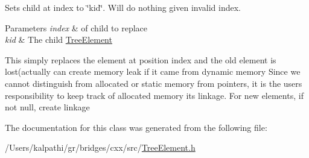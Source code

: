 Sets child at index to \char`\"{}kid\char`\"{}. Will do nothing given invalid index.


\begin{DoxyParams}{Parameters}
{\em index} & of child to replace \\
\hline
{\em kid} & The child \mbox{\hyperlink{classbridges_1_1_tree_element}{Tree\+Element}} \\
\hline
\end{DoxyParams}
This simply replaces the element at position index and the old element is lost(actually can create memory leak if it came from dynamic memory Since we cannot distinguish from allocated or static memory from pointers, it is the user\textquotesingle{}s responsibility to keep track of allocated memory its linkage. For new elements, if not null, create linkage

The documentation for this class was generated from the following file\+:\begin{DoxyCompactItemize}
\item 
/\+Users/kalpathi/gr/bridges/cxx/src/\mbox{\hyperlink{_tree_element_8h}{Tree\+Element.\+h}}\end{DoxyCompactItemize}
